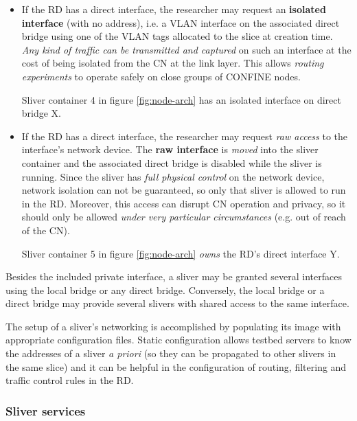 \documentclass[conference]{IEEEtran}
\begin{document}
\begin{itemize}

\item If the RD has a direct interface, the researcher may request an
  \textbf{isolated interface} (with no address), i.e. a VLAN interface on the
  associated direct bridge using one of the VLAN tags allocated to the slice
  at creation time.  \emph{Any kind of traffic can be transmitted and
    captured} on such an interface at the cost of being isolated from the CN
  at the link layer.  This allows \emph{routing experiments} to operate safely
  on close groups of CONFINE nodes.

  Sliver container 4 in figure \ref{fig:node-arch} has an isolated interface
  on direct bridge X.

\item If the RD has a direct interface, the researcher may request \emph{raw
  access} to the interface's network device.  The \textbf{raw interface} is
  \emph{moved} into the sliver container and the associated direct bridge is
  disabled while the sliver is running.  Since the sliver has \emph{full
    physical control} on the network device, network isolation can not be
  guaranteed, so only that sliver is allowed to run in the RD.  Moreover, this
  access can disrupt CN operation and privacy, so it should only be allowed
  \emph{under very particular circumstances} (e.g. out of reach of the CN).

  Sliver container 5 in figure \ref{fig:node-arch} \emph{owns} the RD's direct
  interface Y.

\end{itemize}

Besides the included private interface, a sliver may be granted several
interfaces using the local bridge or any direct bridge.  Conversely, the local
bridge or a direct bridge may provide several slivers with shared access to
the same interface.

The setup of a sliver's networking is accomplished by populating its image
with appropriate configuration files.  Static configuration allows testbed
servers to know the addresses of a sliver \emph{a priori} (so they can be
propagated to other slivers in the same slice) and it can be helpful in the
configuration of routing, filtering and traffic control rules in the RD.

\subsubsection{Sliver services}
\label{sec:sliver-services}
\end{document}
